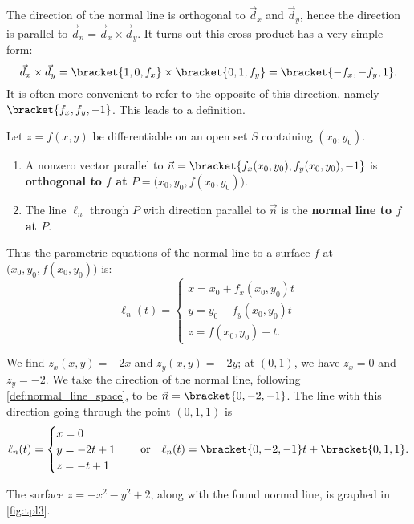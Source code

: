 The direction of the normal line is orthogonal to $\vec d_x$ and $\vec d_y$, hence the direction is parallel to $\vec d_n = \vec d_x\times \vec d_y$. It turns out this cross product has a very simple form:
\[ \vec d_x\times \vec d_y =\bracket{1,0,f_x}\times\bracket{0,1,f_y}=\bracket{-f_x,-f_y,1}.\]
It is often more convenient to refer to the opposite of this direction, namely $\bracket{f_x,f_y,-1}$. This leads to a definition.


\begin{definition}\label{def:normal_line_space}
Let $z=f(x,y)$ be differentiable on an open set $S$ containing $(x_0,y_0)$.

\begin{enumerate}
\item	A nonzero vector parallel to $\vec n=\bracket{f_x(x_0,y_0),f_y(x_0,y_0),-1}$ is \textbf{orthogonal to $f$ at $P=\big(x_0,y_0,f(x_0,y_0)\big)$}.

\item The line $\ell_n$ through $P$ with direction parallel to $\vec n$ is the \textbf{normal line to $f$ at $P$}.
\end{enumerate}
\end{definition}

Thus the parametric equations of the normal line to a surface $f$ at $\big(x_0,y_0,f(x_0,y_0)\big)$ is:
\[
\ell_{n}(t) =
\begin{cases}
x = x_0 + f_x(x_0,y_0)t \\
y = y_0 + f_y(x_0,y_0)t \\
z = f(x_0,y_0) - t.
\end{cases}
\]

{We find $z_x(x,y) = -2x$ and $z_y(x,y) = -2y$; at $(0,1)$, we have $z_x = 0$ and $z_y = -2$. We take the direction of the normal line, following \autoref{def:normal_line_space}, to be $\vec n=\bracket{0,-2,-1}$. The line with this direction going through the point $(0,1,1)$ is 
%
%
\[
\ell_n(t) = \begin{cases}x=0\\y=-2t+1\\z=-t+1\end{cases}
\quad \text{or}\quad
\ell_n(t)=\bracket{0,-2,-1}t+\bracket{0,1,1}.
\]

The surface $z=-x^2-y^2+2$, along with the found normal line, is graphed in \autoref{fig:tpl3}.}

